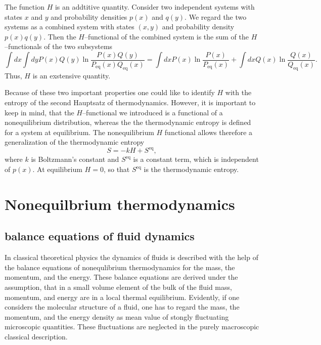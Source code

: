 The function $H$ is an addtitive quantity. Consider two independent systems
with states $x$ and $y$ and probability densities $p(x)$ and $q(y)$. We regard
the two systems as a combined system with states $(x,y)$ and probability
density $p(x)q(y)$. Then the $H$--functional of the combined system is the sum
of the $H$--functionals of the two subsystems
\begin{displaymath}
  \int dx \int dy P(x) Q(y) \ln \frac{P(x) Q(y)}
                                     {P_{\textrm{eq}}(x) Q_{\textrm{eq}}(x)}=
\int dx P(x)  \ln \frac{P(x)}{P_{\textrm{eq}}(x)}  +
\int dx Q(x)  \ln \frac{Q(x)}{Q_{\textrm{eq}}(x)}.
\end{displaymath}
Thus, $H$ is an exstensive quantity.
 
Because of these two important properties one could like  to  identify $H$
with the entropy
of the second Hauptsatz of thermodynamics. However, it is important to keep in
mind, that the $H$--functional we introduced is a functional of a
nonequilibrium distribution, whereas the the thermodynamic entropy is defined
for a  system at equilibrium. The nonequilibrium $H$ functional allows 
therefore a  generalization of the thermodynamic entropy
\begin{displaymath}
  S = -k H + S^{\textrm{eq}},
\end{displaymath}
where $k$ is Boltzmann's constant and $S^{\textrm{eq}}$ is a constant term,
which is independent of $p(x)$. At equilibrium $H=0$, so that 
$S^{\textrm{eq}}$ is the thermodynamic entropy.


\section{Nonequilbrium thermodynamics}
\subsection{balance equations of fluid dynamics}
In classical theoretical physics the dynamics of fluids is described with the
help of the balance equations of nonequlibrium thermodynamics for the mass,
the momentum, and the energy. These balance equations are derived under the
assumption, that in a small volume element of the bulk of the fluid mass,
momentum, and energy are in a local thermal equilibrium. Evidently, if one
considers the molecular structure of a fluid, one has to regard the mass, the
momentum, and the energy density as mean value of stongly fluctuating
microscopic quantities. These fluctuations are neglected in the purely
macroscopic classical description. 

